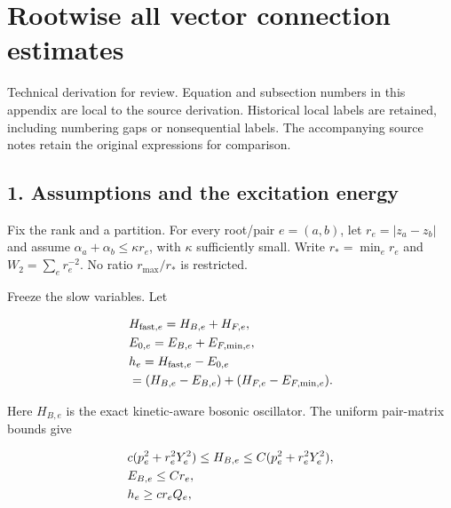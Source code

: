 \clearpage
\section{Rootwise all vector connection
estimates}\label{e-rootwise-all-vector-connection-estimates}

Technical derivation for review. Equation and subsection numbers in this
appendix are local to the source derivation. Historical local labels are
retained, including numbering gaps or nonsequential labels. The
accompanying source notes retain the original expressions for
comparison.

\subsection{1. Assumptions and the excitation
energy}\label{e-assumptions-and-the-excitation-energy}

Fix the rank and a partition. For every root/pair \(e=(a,b)\), let
\(r_{e}=\vert z_{a}-z_{b}\vert\) and assume
\(\alpha _{a}+\alpha _{b} \le  \kappa  r_{e}\), with \(\kappa\)
sufficiently small. Write \(r_{*}=\min _{e} r_{e}\) and
\(W_{2}=\sum _{e} r_{e}^{-2}\). No ratio \(r_{\max}/r_{*}\) is
restricted.

Freeze the slow variables. Let

\begin{gather*}
\begin{aligned}
& H_{\mathrm{fast},e} = H_{B,e} + H_{F,e}, \\
& E_{0,e} = E_{B,e} + E_{F,\mathrm{min},e}, \\
& h_{e} = H_{\mathrm{fast},e} - E_{0,e} \\
& = (H_{B,e}-E_{B,e}) + (H_{F,e}-E_{F,\mathrm{min},e}).
\end{aligned}\notag
\end{gather*}

Here \(H_{B,e}\) is the exact kinetic-aware bosonic oscillator. The
uniform pair-matrix bounds give

\begin{gather*}
\begin{aligned}
& c(p_{e}^{2}+r_{e}^{2} Y_{e}^{2}) \le  H_{B,e} \le  C(p_{e}^{2}+r_{e}^{2} Y_{e}^{2}), \\
& E_{B,e} \le  C r_{e}, \\
& h_{e} \ge  c r_{e} Q_{e},
\end{aligned}\notag
\end{gather*}

